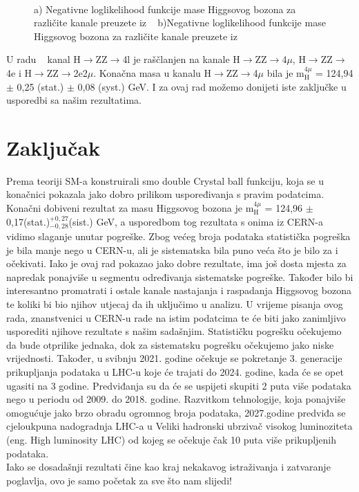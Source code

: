 \documentclass[12pt,a4paper,oneside]{article}
\begin{document}
\begin{linenumbers}
\begin{figure}[H]
			~ %
			\caption{a) Negativne loglikelihood funkcije mase Higgsovog bozona za različite kanale preuzete iz ~\cite{kolaboracija}	b)Negativne loglikelihood funkcije mase Higgsovog bozona za različite kanale preuzete iz ~\cite{cms-clanak} }\label{fig:grafovi-978}
		\end{figure}		
		
		
		U radu ~\cite{cms-clanak} kanal H$\rightarrow$ZZ$\rightarrow$4l je raščlanjen na kanale H$\rightarrow$ZZ$\rightarrow$4$\mu$, H$\rightarrow$ZZ$\rightarrow$4e i H$\rightarrow$ZZ$\rightarrow$2e2$\mu$.
		Konačna masa u kanalu H$\rightarrow$ZZ$\rightarrow$4$\mu$ bila je 
		m${_{\mathrm{H}}^{4\mu}}$ = 124,94 $\pm$ 0,25 (stat.) $\pm$ 0,08 (syst.) GeV. I za ovaj rad možemo donijeti iste zaključke u usporedbi sa našim rezultatima.
		
		\newpage
		\section{Zaključak}
		Prema teoriji SM-a konstruirali smo double Crystal ball funkciju, koja se u konačnici pokazala jako dobro prilikom uspoređivanja s pravim podatcima. Konačni dobiveni rezultat za masu Higgsovog bozona je 
		m${_{\mathrm{H}}^{4\mu}}$ = 124,96 $\pm$ 0,17(stat.)$_{-0,28}^{+0,27}$(sist.) GeV, a usporedbom tog rezultata s onima iz CERN-a vidimo slaganje unutar pogreške. Zbog većeg broja podataka statistička pogreška je bila manje nego u CERN-u, ali je sistematska bila puno veća što je bilo za i očekivati. Iako je ovaj rad pokazao jako dobre rezultate, ima još dosta mjesta za napredak ponajviše u segmentu određivanja sistematske pogreške. Također bilo bi interesantno promatrati i ostale kanale nastajanja i raspadanja Higgsovog bozona te koliki bi bio njihov utjecaj da ih uključimo u analizu. 
		U vrijeme pisanja ovog rada, znanstvenici u CERN-u rade na istim podatcima te će biti jako zanimljivo usporediti njihove rezultate s našim sadašnjim. Statističku pogrešku očekujemo da bude otprilike jednaka, dok za sistematsku pogrešku očekujemo jako niske vrijednosti. Također, u svibnju 2021. godine očekuje se pokretanje 3. generacije prikupljanja podataka u LHC-u koje će trajati do 2024. godine, kada će se opet ugasiti na 3 godine. Predviđanja su da će se uspijeti skupiti 2 puta više podataka nego u periodu od 2009. do 2018. godine. Razvitkom tehnologije, koja ponajviše omogućuje jako brzo obradu ogromnog broja podataka, 2027.godine predviđa se cjeloukpuna nadogradnja LHC-a u Veliki hadronski ubrzivač visokog luminoziteta (eng. High luminosity LHC) od kojeg se očekuje čak 10 puta više prikupljenih podataka.\\
		 Iako se dosadašnji rezultati čine kao kraj nekakavog istraživanja i zatvaranje poglavlja, ovo je samo početak za sve što nam slijedi! 
		

\end{linenumbers}
\end{document}

